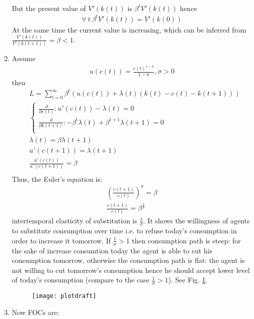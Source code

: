 \documentclass[a4paper]{article}
\begin{document}
\begin{enumerate}
\begin{align*}
	\end{align*}
	But the present value of $V'(k(t))$ is $\beta^t V'(k(t))$ hence 
	\begin{align*}
	\forall\ t\ \beta^t V'(k(t)) = V'(k(0))
	\end{align*}
	At the same time the current value is increasing, which can be inferred from $\frac{V'(k(t))}{V'(k(t+1))} = \beta < 1$.
	\item Assume 
	\begin{align*}
	u(c(t)) = \frac{c(t)^{1 - \sigma}}{1 - \sigma}, \sigma > 0
\end{align*}
then
\begin{align*}
&L = \sum_{t=0}^{\infty} \beta^t(u(c(t)) + \lambda(t)(k(t) - c(t) - k(t+1)))\\
&\begin{cases}\frac{\partial}{\partial c(t)}: u'(c(t)) - \lambda(t) = 0\\
\frac{\partial}{\partial k(t+1)}: -\beta^t \lambda(t) + \beta^{t+1}\lambda(t+1) = 0\\
\end{cases}\\
&\lambda(t) = \beta \lambda(t+1)\\
&u'(c(t+1)) = \lambda(t+1)\\
&\frac{u'(c(t))}{u'(c(t+1))} = \beta\\
\end{align*}
Thus, the Euler's equation is:
\begin{align*}
\left(\frac{c(t+1)}{c(t)}\right)^{\sigma} = \beta\\
\frac{c(t+1)}{c(t)} = \beta^{\frac{1}{\sigma}}
\end{align*}
intertemporal elasticity of substitution is $\frac{1}{\sigma}$. It shows the willingness of agents to substitute consumption over time i.e. to refuse today's consumption in order to increase it tomorrow. If $\frac{1}{\sigma} > 1$ then consumption path is steep: for the sake of increase consumtion today the agent is able to cut his consumption tomorrow, otherwise the consumption path is flat: the agent is not willing to cut tomorrow's consumption hence he should accept lower level of today's consumption (compare to the case $\frac{1}{\sigma} > 1$). See Fig. \ref{fig3}.
\begin{figure}[h]
	\centering
	\texttt{[image: plotdraft]}
	\caption{}\label{fig3}
\end{figure}
\item Now FOCs are:
\begin{align*}

\end{align*}
\end{enumerate}
\end{document}
